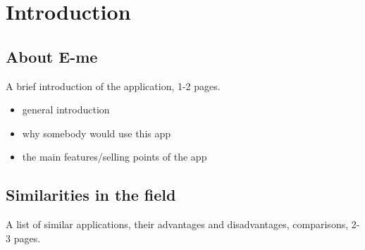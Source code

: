 \chapter{Introduction}\label{ch:INTRO}

\section{About E-me}\label{sec:INTRO:about}
A brief introduction of the application, 1-2 pages.

\begin{itemize}
    \item general introduction
    \item why somebody would use this app
    \item the main features/selling points of the app
\end{itemize}

\section{Similarities in the field}\label{sec:INTRO:sa}

A list of similar applications, their advantages and disadvantages, comparisons, 2-3 pages.


